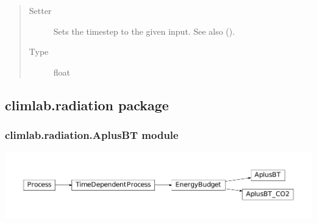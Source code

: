 \documentclass[a4paper,10pt,english]{sphinxmanual}
\begin{document}
\begin{fulllineitems}
\begin{fulllineitems}
\begin{quote}
\begin{description}
\item[{Setter}] \leavevmode
Sets the timestep to the given input. See also {\hyperref[api/climlab.process:climlab.process.time_dependent_process.TimeDependentProcess.set_timestep]{\emph{}}} ().

\item[{Type}] \leavevmode
float

\end{description}\end{quote}

\end{fulllineitems}


\end{fulllineitems}



\subsection{climlab.radiation package}
\label{api/climlab.radiation:climlab-radiation-package}\label{api/climlab.radiation::doc}

\subsubsection{climlab.radiation.AplusBT module}
\label{api/climlab.radiation:climlab-radiation-aplusbt-module}
\includegraphics{inheritance-02be59372c5ce161a2b728197b304d7b4804f2e1.pdf}
\label{api/climlab.radiation:module-climlab.radiation.AplusBT}
\end{document}
